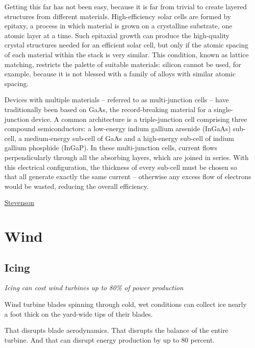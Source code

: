 \documentclass[
]{book}
\begin{document}
Getting this far has not been easy, because it is far from trivial to create layered structures from different materials. High-efficiency solar cells are formed by epitaxy, a process in which material is grown on a crystalline substrate, one atomic layer at a time. Such epitaxial growth can produce the high-quality crystal structures needed for an efficient solar cell, but only if the atomic spacing of each material within the stack is very similar. This condition, known as lattice matching, restricts the palette of suitable materials: silicon cannot be used, for example, because it is not blessed with a family of alloys with similar atomic spacing.

Devices with multiple materials -- referred to as multi-junction cells -- have traditionally been based on GaAs, the record-breaking material for a single-junction device. A common architecture is a triple-junction cell comprising three compound semiconductors: a low-energy indium gallium arsen­ide (InGaAs) sub-cell, a medium-energy sub-cell of GaAs and a high-energy sub-cell of indium gallium phosphide (InGaP). In these multi-junction cells, current flows perpendicularly through all the absorbing layers, which are joined in series. With this electrical configuration, the thickness of every sub-cell must be chosen so that all generate exactly the same current -- otherwise any excess flow of electrons would be wasted, reducing the overall efficiency.

\href{https://physicsworld.com/a/sunny-superpower-solar-cells-close-in-on-50-efficiency/}{Stevenson}

\hypertarget{wind}{%
\chapter{Wind}\label{wind}}

\hypertarget{icing}{%
\section{Icing}\label{icing}}

\emph{Icing can cost wind turbines up to 80\% of power production}

Wind turbine blades spinning through cold, wet conditions can collect ice nearly a foot thick on the yard-wide tips of their blades.

That disrupts blade aerodynamics. That disrupts the balance of the entire turbine. And that can disrupt energy production by up to 80 percent.
\end{document}
